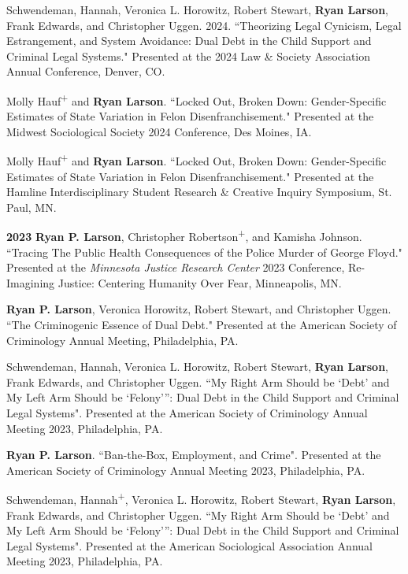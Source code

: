 \documentclass[letterpaper]{article}
\newenvironment{publist}{%
  \begin{list}{}{%
    \setlength{\leftmargin}{0cm}   %
    \setlength{\labelwidth}{2cm}     %
    \setlength{\labelsep}{0.5cm}     %
  }%
}{%
  \end{list}%
}
\begin{document}
\begin{publist}
\item Schwendeman, Hannah, Veronica L. Horowitz, Robert Stewart, \textbf{Ryan Larson}, Frank Edwards, and Christopher Uggen. 2024.  ``Theorizing Legal Cynicism, Legal Estrangement, and System Avoidance: Dual Debt in the Child Support and Criminal Legal Systems." Presented at the 2024 Law \& Society Association Annual Conference, Denver, CO. 

\item Molly Hauf\textsuperscript{+} and \textbf{Ryan Larson}. ``Locked Out, Broken Down: Gender-Specific Estimates of State Variation in Felon Disenfranchisement." Presented at the Midwest Sociological Society 2024 Conference, Des Moines, IA. 

\item Molly Hauf\textsuperscript{+} and \textbf{Ryan Larson}. ``Locked Out, Broken Down: Gender-Specific Estimates of State Variation in Felon Disenfranchisement." Presented at the Hamline Interdisciplinary Student Research \& Creative Inquiry Symposium, St. Paul, MN. 

\item[\textbf{2023}] \textbf{Ryan P. Larson}, Christopher Robertson\textsuperscript{+}, and Kamisha Johnson. ``Tracing The Public Health Consequences of the Police Murder of George Floyd." Presented at the \textit{Minnesota Justice Research Center} 2023 Conference, Re-Imagining Justice: Centering Humanity Over Fear, Minneapolis, MN.   

\item \textbf{Ryan P. Larson}, Veronica Horowitz, Robert Stewart, and Christopher Uggen. ``The Criminogenic Essence of Dual Debt." Presented at the American Society of Criminology Annual Meeting, Philadelphia, PA. 

\item Schwendeman, Hannah, Veronica L. Horowitz, Robert Stewart, \textbf{Ryan Larson}, Frank Edwards, and Christopher Uggen. ``My Right Arm Should be ‘Debt’ and My Left Arm Should be ‘Felony’”:
Dual Debt in the Child Support and Criminal Legal Systems". Presented at the American Society of Criminology Annual Meeting 2023, Philadelphia, PA. 

\item \textbf{Ryan P. Larson}. ``Ban-the-Box, Employment, and Crime". Presented at the American Society of Criminology Annual Meeting 2023, Philadelphia, PA. 

\item Schwendeman, Hannah\textsuperscript{+}, Veronica L. Horowitz, Robert Stewart, \textbf{Ryan Larson}, Frank Edwards, and Christopher Uggen. ``My Right Arm Should be ‘Debt’ and My Left Arm Should be ‘Felony’”:
Dual Debt in the Child Support and Criminal Legal Systems". Presented at the American Sociological Association Annual Meeting 2023, Philadelphia, PA. 


\end{publist}
\end{document}
